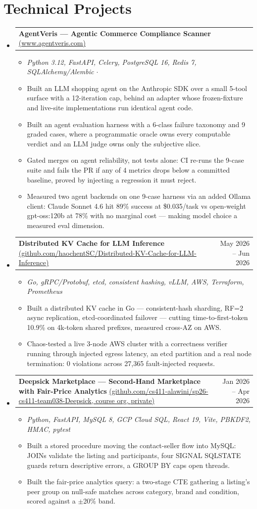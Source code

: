 \documentclass[letterpaper,11pt]{article}
\makeatletter
\newcommand{\resumeItem}[1]{
  \item\small{
    {#1 \vspace{-2pt}}
  }
}
\newcommand{\resumeProjectHeading}[2]{
    \item
    \begin{tabular*}{0.97\textwidth}{l@{\extracolsep{\fill}}r}
      \small#1 & #2 \\
    \end{tabular*}\vspace{-7pt}
}
\newcommand{\resumeSubHeadingListStart}{\begin{itemize}[leftmargin=0.15in, label={}]}
\newcommand{\resumeSubHeadingListEnd}{\end{itemize}}
\newcommand{\resumeItemListStart}{\begin{itemize}}
\newcommand{\resumeItemListEnd}{\end{itemize}\vspace{-5pt}}
\makeatother
\begin{document}
\section{Technical Projects}
  \resumeSubHeadingListStart
\resumeProjectHeading
  {\textbf{AgentVeris --- Agentic Commerce Compliance Scanner} \href{https://www.agentveris.com/}{\scriptsize(www.agentveris.com)}}{}
  \resumeItemListStart
    \resumeItem{\emph{Python 3.12, FastAPI, Celery, PostgreSQL 16, Redis 7, SQLAlchemy/Alembic $\cdot$}}
    \resumeItem{Built an LLM shopping agent on the Anthropic SDK over a small 5-tool surface with a 12-iteration cap, behind an adapter whose frozen-fixture and live-site implementations run identical agent code.}
    \resumeItem{Built an agent evaluation harness with a 6-class failure taxonomy and 9 graded cases, where a programmatic oracle owns every computable verdict and an LLM judge owns only the subjective slice.}
    \resumeItem{Gated merges on agent reliability, not tests alone: CI re-runs the 9-case suite and fails the PR if any of 4 metrics drops below a committed baseline, proved by injecting a regression it must reject.}
    \resumeItem{Measured two agent backends on one 9-case harness via an added Ollama client: Claude Sonnet 4.6 hit 89\% success at \$0.035/task vs open-weight gpt-oss:120b at 78\% with no marginal cost --- making model choice a measured eval dimension.}
  \resumeItemListEnd

\resumeProjectHeading
  {\textbf{Distributed KV Cache for LLM Inference} \href{https://github.com/haochentSC/Distributed-KV-Cache-for-LLM-Inference}{\scriptsize(github.com/haochentSC/Distributed-KV-Cache-for-LLM-Inference)}}{May 2026 -- Jun 2026}
  \resumeItemListStart
    \resumeItem{\emph{Go, gRPC/Protobuf, etcd, consistent hashing, vLLM, AWS, Terraform, Prometheus}}
    \resumeItem{Built a distributed KV cache in Go --- consistent-hash sharding, RF=2 async replication, etcd-coordinated failover --- cutting time-to-first-token 10.9\% on 4k-token shared prefixes, measured cross-AZ on AWS.}
    \resumeItem{Chaos-tested a live 3-node AWS cluster with a correctness verifier running through injected egress latency, an etcd partition and a real node termination: 0 violations across 27,365 fault-injected requests.}
  \resumeItemListEnd

\resumeProjectHeading
  {\textbf{Deepsick Marketplace --- Second-Hand Marketplace with Fair-Price Analytics} \href{https://github.com/cs411-alawini/sp26-cs411-team038-Deepsick}{\scriptsize(github.com/cs411-alawini/sp26-cs411-team038-Deepsick, course org, private)}}{Jan 2026 -- Apr 2026}
  \resumeItemListStart
    \resumeItem{\emph{Python, FastAPI, MySQL 8, GCP Cloud SQL, React 19, Vite, PBKDF2, HMAC, pytest}}
    \resumeItem{Built a stored procedure moving the contact-seller flow into MySQL: JOINs validate the listing and participants, four SIGNAL SQLSTATE guards return descriptive errors, a GROUP BY caps open threads.}
    \resumeItem{Built the fair-price analytics query: a two-stage CTE gathering a listing's peer group on null-safe matches across category, brand and condition, scored against a $\pm$20\% band.}
  \resumeItemListEnd
  \resumeSubHeadingListEnd
\end{document}
